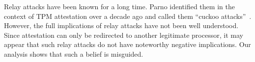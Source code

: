 
Relay attacks have been known for a long time. Parno identified them in the context of TPM attestation over a decade ago and called them ``cuckoo attacks''~\cite{parno2008bootstrapping}. However, the full implications of relay attacks have not been well understood. Since attestation can only be redirected to another legitimate processor, it may appear that such relay attacks do not have noteworthy negative implications. Our analysis shows that such a belief is misguided.

